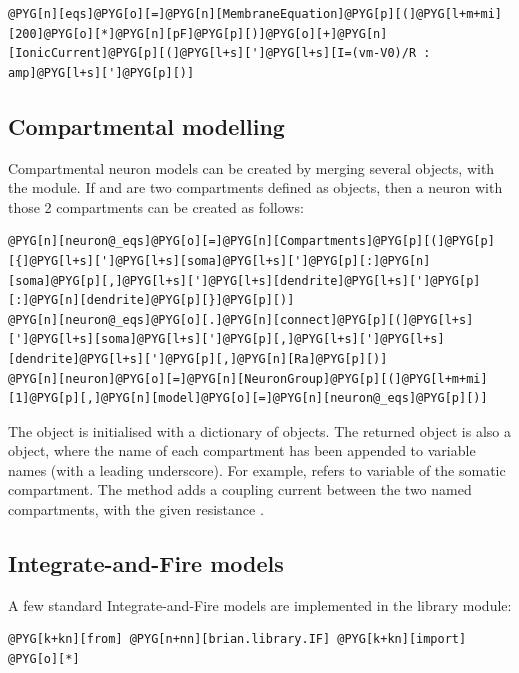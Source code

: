 \documentclass[letterpaper,10pt,english]{manual}
\begin{document}
\begin{Verbatim}[commandchars=@\[\]]
@PYG[n][eqs]@PYG[o][=]@PYG[n][MembraneEquation]@PYG[p][(]@PYG[l+m+mi][200]@PYG[o][*]@PYG[n][pF]@PYG[p][)]@PYG[o][+]@PYG[n][IonicCurrent]@PYG[p][(]@PYG[l+s][']@PYG[l+s][I=(vm-V0)/R : amp]@PYG[l+s][']@PYG[p][)]
\end{Verbatim}


\subsection{Compartmental modelling}

Compartmental neuron models can be created by merging several  objects,
with the  module. If  and  are two compartments defined as
 objects, then a neuron with those 2 compartments can be created as follows:

\begin{Verbatim}[commandchars=@\[\]]
@PYG[n][neuron@_eqs]@PYG[o][=]@PYG[n][Compartments]@PYG[p][(]@PYG[p][{]@PYG[l+s][']@PYG[l+s][soma]@PYG[l+s][']@PYG[p][:]@PYG[n][soma]@PYG[p][,]@PYG[l+s][']@PYG[l+s][dendrite]@PYG[l+s][']@PYG[p][:]@PYG[n][dendrite]@PYG[p][}]@PYG[p][)]
@PYG[n][neuron@_eqs]@PYG[o][.]@PYG[n][connect]@PYG[p][(]@PYG[l+s][']@PYG[l+s][soma]@PYG[l+s][']@PYG[p][,]@PYG[l+s][']@PYG[l+s][dendrite]@PYG[l+s][']@PYG[p][,]@PYG[n][Ra]@PYG[p][)]
@PYG[n][neuron]@PYG[o][=]@PYG[n][NeuronGroup]@PYG[p][(]@PYG[l+m+mi][1]@PYG[p][,]@PYG[n][model]@PYG[o][=]@PYG[n][neuron@_eqs]@PYG[p][)]
\end{Verbatim}

The  object is initialised with a dictionary of  objects.
The returned object  is also a  object, where the name of
each compartment has been appended to variable names (with a leading underscore).
For example,  refers to variable  of the somatic compartment.
The  method adds a coupling current between the two named compartments, with the given
resistance .


\subsection{Integrate-and-Fire models}

A few standard Integrate-and-Fire models are implemented in the  library module:

\begin{Verbatim}[commandchars=@\[\]]
@PYG[k+kn][from] @PYG[n+nn][brian.library.IF] @PYG[k+kn][import] @PYG[o][*]
\end{Verbatim}
\end{document}
